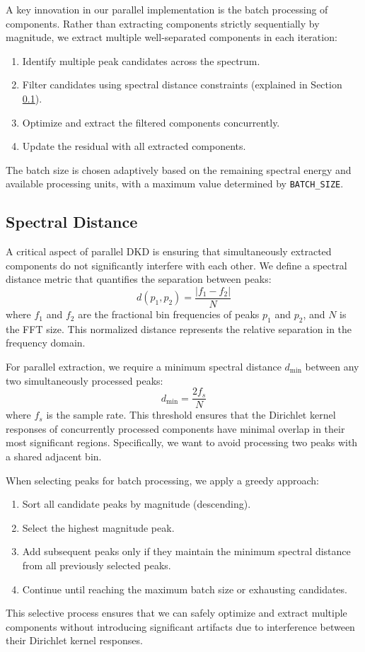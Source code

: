 \documentclass[11pt,twoside]{report}
\numberwithin{thm}{section}
\numberwithin{equation}{section}
\begin{document}
A key innovation in our parallel implementation is the batch processing of components. Rather than extracting components strictly sequentially by magnitude, we extract multiple well-separated components in each iteration:
\begin{enumerate}
    \item Identify multiple peak candidates across the spectrum.
    \item Filter candidates using spectral distance constraints (explained in Section \ref{subsec:spectral_distance}).
    \item Optimize and extract the filtered components concurrently.
    \item Update the residual with all extracted components.
\end{enumerate}
The batch size is chosen adaptively based on the remaining spectral energy and available processing units, with a maximum value determined by \texttt{BATCH\_SIZE}.

\subsection{Spectral Distance}
\label{subsec:spectral_distance}

A critical aspect of parallel DKD is ensuring that simultaneously extracted components do not significantly interfere with each other. We define a spectral distance metric that quantifies the separation between peaks:
\begin{equation}
d(p_1, p_2) = \frac{|f_1 - f_2|}{N}
\end{equation}
where $f_1$ and $f_2$ are the fractional bin frequencies of peaks $p_1$ and $p_2$, and $N$ is the FFT size. This normalized distance represents the relative separation in the frequency domain.

For parallel extraction, we require a minimum spectral distance $d_{\min}$ between any two simultaneously processed peaks:
\begin{equation}
d_{\min} = \frac{2f_s}{N}
\end{equation}
where $f_s$ is the sample rate. This threshold ensures that the Dirichlet kernel responses of concurrently processed components have minimal overlap in their most significant regions. Specifically, we want to avoid processing two peaks with a shared adjacent bin.

When selecting peaks for batch processing, we apply a greedy approach:
\begin{enumerate}
    \item Sort all candidate peaks by magnitude (descending).
    \item Select the highest magnitude peak.
    \item Add subsequent peaks only if they maintain the minimum spectral distance from all previously selected peaks.
    \item Continue until reaching the maximum batch size or exhausting candidates.
\end{enumerate}
This selective process ensures that we can safely optimize and extract multiple components without introducing significant artifacts due to interference between their Dirichlet kernel responses.
\end{document}
